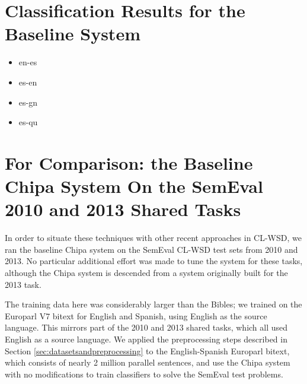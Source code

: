 \section{Classification Results for the Baseline System}

\begin{itemize}
\item en-es
\item es-en
\item es-gn
\item es-qu
\end{itemize}


\section{For Comparison: the Baseline Chipa System On the SemEval 2010 and 2013
Shared Tasks}
\label{sec:baseline-semeval}

In order to situate these techniques with other recent approaches in CL-WSD, we
ran the baseline Chipa system on the SemEval CL-WSD test sets from 2010 and
2013. No particular additional effort was made to tune the system for these
tasks, although the Chipa system is descended from a system originally built
for the 2013 task.

The training data here was considerably larger than the Bibles; we trained on
the Europarl V7 bitext for English and Spanish, using English as the source
language. This mirrors part of the 2010 and 2013 shared tasks, which all used
English as a source language. We applied the preprocessing steps described in
Section \ref{sec:datasetsandpreprocessing} to the English-Spanish Europarl
bitext, which consists of nearly 2 million parallel sentences, and use the
Chipa system with no modifications to train classifiers to solve the SemEval
test problems.



